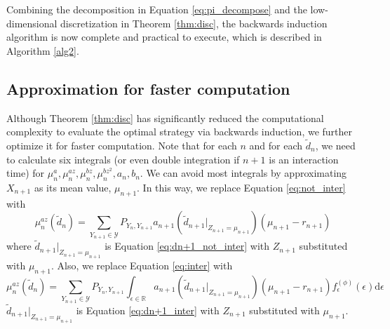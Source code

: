 Combining the decomposition in Equation \eqref{eq:pi_decompose} and the low-dimensional discretization in Theorem \ref{thm:disc}, the backwards induction algorithm is now complete and practical to execute, which is described in Algorithm \ref{alg2}.

\subsection{Approximation for faster computation}\label{sec:approx}
Although Theorem \ref{thm:disc} has significantly reduced the computational complexity to evaluate the optimal strategy via backwards induction, we further optimize it for faster computation. Note that for each $n$ and for each $\tilde d_n$, we need to calculate six integrals (or even double integration if $n+1$ is an interaction time) for $\mu_n^a,\mu_n^{az},\mu_n^{bz},\mu_n^{bz^2},a_n,b_n$. We can avoid most integrals by approximating $X_{n+1}$ as its mean value, $\mu_{n+1}$. In this way, we replace Equation \eqref{eq:not_inter} with \begin{equation}
    \label{eq:not_inter_approx}
    \mu_n^{az}(\tilde d_n)=\sum_{Y_{n+1}\in\mathcal Y}P_{Y_n,Y_{n+1}} a_{n+1}(\tilde d_{n+1}|_{Z_{n+1}=\mu_{n+1}})(\mu_{n+1}-r_{n+1})
\end{equation} where $\tilde d_{n+1}|_{Z_{n+1}=\mu_{n+1}}$ is Equation \eqref{eq:dn+1_not_inter} with $Z_{n+1}$ substituted with $\mu_{n+1}$. Also, we replace Equation \eqref{eq:inter} with \begin{equation}
    \label{eq:inter_approx}
    \mu_{n}^{az}(\tilde d_n)=\sum_{Y_{n+1}\in\mathcal Y}P_{Y_n,Y_{n+1}}\int_{\epsilon\in\mathbb R} a_{n+1}(\tilde d_{n+1}|_{Z_{n+1}=\mu_{n+1}})(\mu_{n+1}-r_{n+1})f^{(\phi)}_\epsilon(\epsilon)\mathrm d\epsilon
\end{equation} $\tilde d_{n+1}|_{Z_{n+1}=\mu_{n+1}}$ is Equation \eqref{eq:dn+1_inter} with $Z_{n+1}$ substituted with $\mu_{n+1}$.

